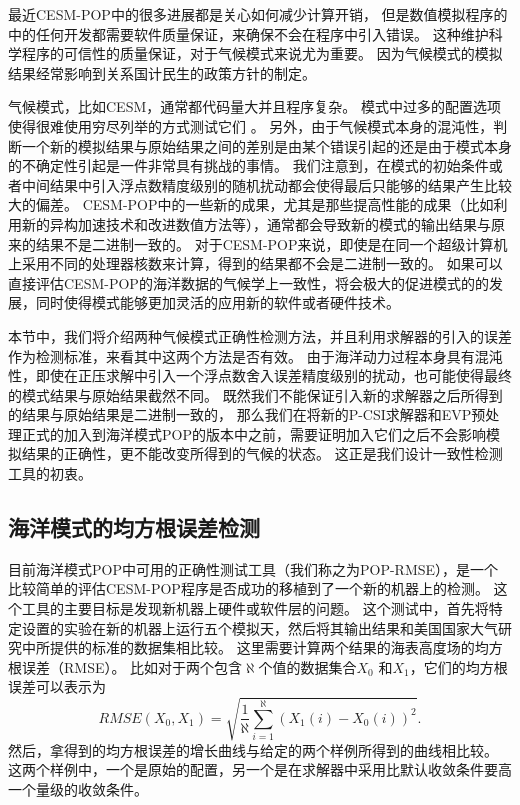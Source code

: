 最近CESM-POP中的很多进展都是关心如何减少计算开销\cite{yong2015}， 但是数值模拟程序的中的任何开发都需要软件质量保证，来确保不会在程序中引入错误。 
这种维护科学程序的可信性的质量保证，对于气候模式来说尤为重要。 
因为气候模式的模拟结果经常影响到关系国计民生的政策方针的制定\cite{carson2002, easterbrook2011}。 

  
气候模式，比如CESM，通常都代码量大并且程序复杂。 
模式中过多的配置选项使得很难使用穷尽列举的方式测试它们 \cite{clune2011, pipitone2012}。 
另外，由于气候模式本身的混沌性，判断一个新的模拟结果与原始结果之间的差别是由某个错误引起的还是由于模式本身的不确定性引起是一件非常具有挑战的事情。 
我们注意到，在模式的初始条件或者中间结果中引入浮点数精度级别的随机扰动都会使得最后只能够的结果产生比较大的偏差。
CESM-POP中的一些新的成果，尤其是那些提高性能的成果（比如利用新的异构加速技术和改进数值方法等），通常都会导致新的模式的输出结果与原来的结果不是二进制一致的。 
对于CESM-POP来说，即使是在同一个超级计算机上采用不同的处理器核数来计算，得到的结果都不会是二进制一致的。 
如果可以直接评估CESM-POP的海洋数据的气候学上一致性，将会极大的促进模式的的发展，同时使得模式能够更加灵活的应用新的软件或者硬件技术。 

本节中，我们将介绍两种气候模式正确性检测方法，并且利用求解器的引入的误差作为检测标准，来看其中这两个方法是否有效。
由于海洋动力过程本身具有混沌性，即使在正压求解中引入一个浮点数舍入误差精度级别的扰动，也可能使得最终的模式结果与原始结果截然不同。 
既然我们不能保证引入新的求解器之后所得到的结果与原始结果是二进制一致的，
那么我们在将新的P-CSI求解器和EVP预处理正式的加入到海洋模式POP的版本中之前，需要证明加入它们之后不会影响模拟结果的正确性，更不能改变所得到的气候的状态。
这正是我们设计一致性检测工具的初衷。 


\subsection{海洋模式的均方根误差检测}
\label{verify:premethod}
 

目前海洋模式POP中可用的正确性测试工具（我们称之为POP-RMSE），是一个比较简单的评估CESM-POP程序是否成功的移植到了一个新的机器上的检测。 
这个工具的主要目标是发现新机器上硬件或软件层的问题。 
这个测试中，首先将特定设置的实验在新的机器上运行五个模拟天，然后将其输出结果和美国国家大气研究中所提供的标准的数据集相比较。
这里需要计算两个结果的海表高度场的均方根误差（RMSE）。 
比如对于两个包含$\aleph$个值的数据集合$X_0$ 和$X_1$，它们的均方根误差可以表示为
 \begin{equation*}
 RMSE(X_0, X_1) = \sqrt{\frac{1}{\aleph}\sum_{i=1}^\aleph(X_1(i)-X_0(i))^2}.
 \end{equation*}
然后，拿得到的均方根误差的增长曲线与给定的两个样例所得到的曲线相比较。 
这两个样例中，一个是原始的配置，另一个是在求解器中采用比默认收敛条件要高一个量级的收敛条件。 


